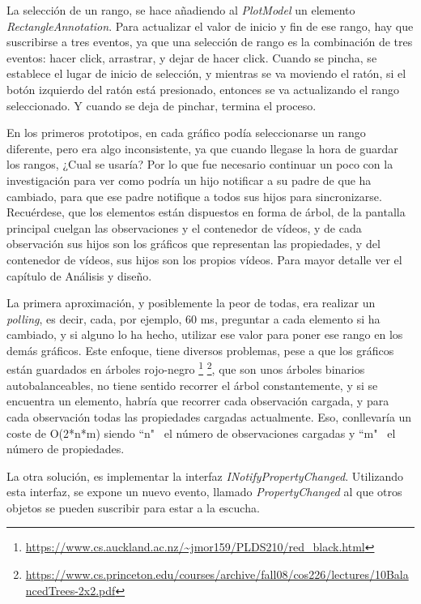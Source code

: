 La selecci\'on de un rango, se hace a\~nadiendo al \emph{PlotModel} un elemento \emph{RectangleAnnotation}.
Para actualizar el valor de inicio y fin de ese rango, hay que suscribirse a tres eventos, ya que una selecci\'on
de rango es la combinaci\'on de tres eventos: hacer click, arrastrar, y dejar de hacer click. Cuando se pincha,
se establece el lugar de inicio de selecci\'on, y mientras se va moviendo el rat\'on, si el bot\'on izquierdo
del rat\'on est\'a presionado, entonces se va actualizando el rango seleccionado. Y cuando se deja de pinchar,
termina el proceso.

En los primeros prototipos, en cada gr\'afico pod\'ia seleccionarse un rango diferente, pero era algo inconsistente, ya
que cuando llegase la hora de guardar los rangos, ¿Cual se usar\'ia? Por lo que fue necesario continuar un poco con la 
investigaci\'on para ver como podr\'ia un hijo notificar a su padre de que ha cambiado, para que ese padre notifique a todos
sus hijos para sincronizarse. Recu\'erdese,
que los elementos est\'an dispuestos en forma de \'arbol, de 
la pantalla principal cuelgan las observaciones y el
contenedor de v\'ideos,
y de cada observaci\'on sus hijos son los gr\'aficos que
representan las propiedades, y del contenedor de v\'ideos, sus hijos
son los propios v\'ideos. Para mayor detalle ver el cap\'itulo de An\'alisis y dise\~no.

La primera aproximaci\'on, y posiblemente la peor de todas, era realizar un \emph{polling}, es decir, cada, por ejemplo, 60 ms,
preguntar a cada elemento si ha cambiado, y si alguno lo ha hecho, utilizar ese valor para poner ese rango en los dem\'as 
gr\'aficos. Este enfoque, tiene diversos problemas, pese a que los gr\'aficos est\'an guardados en \'arboles rojo-negro
\footnote{\url{https://www.cs.auckland.ac.nz/~jmor159/PLDS210/red\_black.html}}
\footnote{\url{https://www.cs.princeton.edu/courses/archive/fall08/cos226/lectures/10BalancedTrees-2x2.pdf}}, que son
unos \'arboles binarios autobalanceables,
no tiene sentido recorrer el \'arbol constantemente, y si se encuentra un elemento, habr\'ia que recorrer cada observaci\'on cargada,
y para cada observaci\'on todas las propiedades cargadas actualmente. Eso,
conllevar\'ia un coste de O(2*n*m) siendo ``n" \ el n\'umero de observaciones cargadas y ``m" \ el n\'umero de propiedades.

La otra soluci\'on, es implementar la interfaz \emph{INotifyPropertyChanged}. Utilizando esta interfaz, se expone un 
nuevo evento, llamado \emph{PropertyChanged} al que otros objetos se pueden suscribir para estar a la escucha. 

